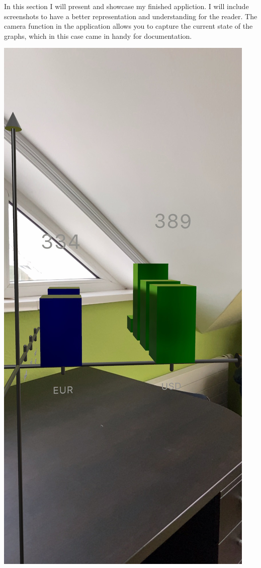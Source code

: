 \documentclass{report}
\begin{document}
In this section I will present and showcase my finished appliction. I will include screenshots to have a better representation and understanding for the reader.
The camera function in the application allows you to capture the current state of the graphs, which in this case came in handy for documentation.

\includegraphics[scale=0.2]{front.jpeg}
\end{document}
